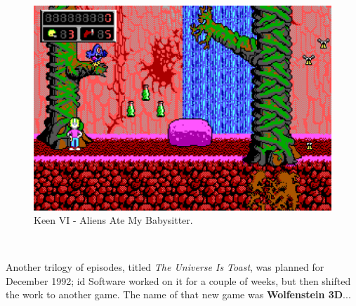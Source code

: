 \documentclass[book.tex]{subfiles}
\begin{document}
\begin{figure}[H]
  \centering
  \includegraphics[width=.95\textwidth]{screenshots_300dpi/keen3_1.png}
  \caption*{Keen VI - Aliens Ate My Babysitter.}
\label{fig:keen_1}
\end{figure}


\\

\par
Another trilogy of episodes, titled \textit{The Universe Is Toast}, was planned for December 1992; id Software worked on it for a couple of weeks, but then shifted the work to another game. The name of that new game was \textbf{Wolfenstein 3D}...
\end{document}
